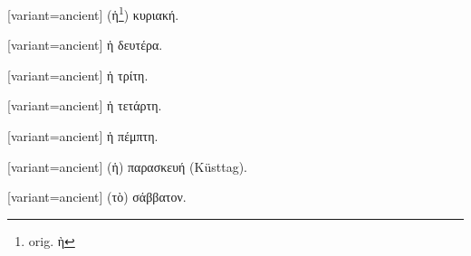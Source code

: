 %
\switchcolumn
\begin{greek}[variant=ancient]%
(ἡ\footnote{\textlatin{%
orig. \textgreek{ὴ}}%
}) κυριακή.%
\end{greek}%
\switchcolumn*
{}%
\switchcolumn
\begin{greek}[variant=ancient]%
ἡ δευτέρα.%
\end{greek}%
\switchcolumn*
{}%
\switchcolumn
\begin{greek}[variant=ancient]%
ἡ τρίτη.%
\end{greek}%
\switchcolumn*
{}%
\switchcolumn
\begin{greek}[variant=ancient]%
ἡ τετάρτη.%
\end{greek}%
\switchcolumn*
{}%
\switchcolumn
\begin{greek}[variant=ancient]%
ἡ πέμπτη.%
\end{greek}%
\switchcolumn*
{}%
\switchcolumn
\begin{greek}[variant=ancient]%
(ἡ) παρασκευή \textgerman{(Küst\textcompwordmark{}tag)}.%
\end{greek}%
\switchcolumn*
{}%
\switchcolumn
\begin{greek}[variant=ancient]%
(τὸ) σάββατον.%
\end{greek}%
\switchcolumn*
